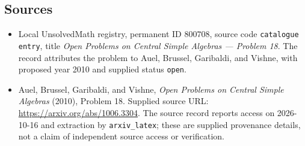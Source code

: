 \documentclass[11pt]{article}
\begin{document}
\subsection{Sources}
\begin{itemize}
\item Local UnsolvedMath registry, permanent ID \(800708\), source code \texttt{catalogue entry}, title \emph{Open Problems on Central Simple Algebras --- Problem 18}. The record attributes the problem to Auel, Brussel, Garibaldi, and Vishne, with proposed year 2010 and supplied status \texttt{open}.
\item Auel, Brussel, Garibaldi, and Vishne, \emph{Open Problems on Central Simple Algebras} (2010), Problem 18. Supplied source URL: \url{https://arxiv.org/abs/1006.3304}. The source record reports access on 2026-10-16 and extraction by \texttt{arxiv\_latex}; these are supplied provenance details, not a claim of independent source access or verification.
\end{itemize}
\end{document}
